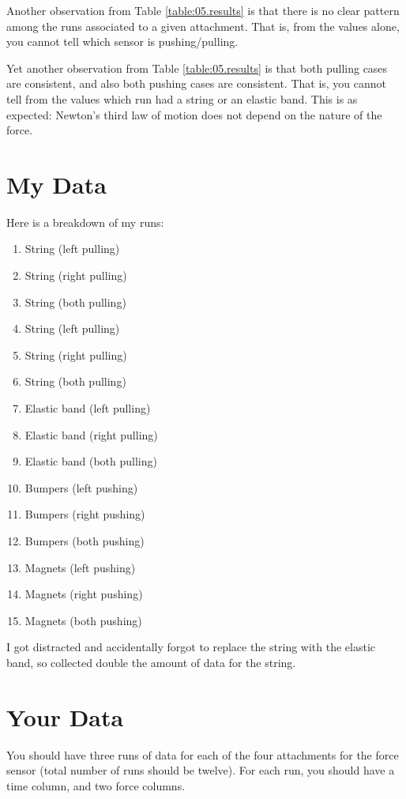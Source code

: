 Another observation from Table \ref{table:05.results} is that there is no clear pattern among the runs associated to a given attachment. That is, from the values alone, you cannot tell which sensor is pushing/pulling.

Yet another observation from Table \ref{table:05.results} is that both pulling cases are consistent, and also both pushing cases are consistent. That is, you cannot tell from the values which run had a string or an elastic band. This is as expected: Newton's third law of motion does not depend on the nature of the force.
\section{My Data}
Here is a breakdown of my runs:
\begin{enumerate}
    \item String (left pulling)
    \item String (right pulling)
    \item String (both pulling)
    \item String (left pulling)
    \item String (right pulling)
    \item String (both pulling)
    \item Elastic band (left pulling)
    \item Elastic band (right pulling)
    \item Elastic band (both pulling)
    \item Bumpers (left pushing)
    \item Bumpers (right pushing)
    \item Bumpers (both pushing)
    \item Magnets (left pushing)
    \item Magnets (right pushing)
    \item Magnets (both pushing)
\end{enumerate}
I got distracted and accidentally forgot to replace the string with the elastic band, so collected double the amount of data for the string.
\section{Your Data}
You should have three runs of data for each of the four attachments for the force sensor (total number of runs should be twelve). For each run, you should have a time column, and two force columns. 
\newpage
